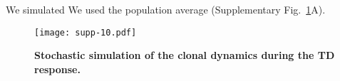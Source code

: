 \documentclass[11pt]{article}
\begin{document}
We simulated   
We used the 
population average
 (Supplementary Fig.~\ref{fig:clone-dyn}A).


\clearpage



\begin{figure}[htbp]
\center
\texttt{[image: supp-10.pdf]}
\caption{
    \textbf{Stochastic simulation of the clonal dynamics during the TD response.}
    }
       \label{fig:clone-dyn}
       
 \end{figure}
 
 
 
\end{document}
